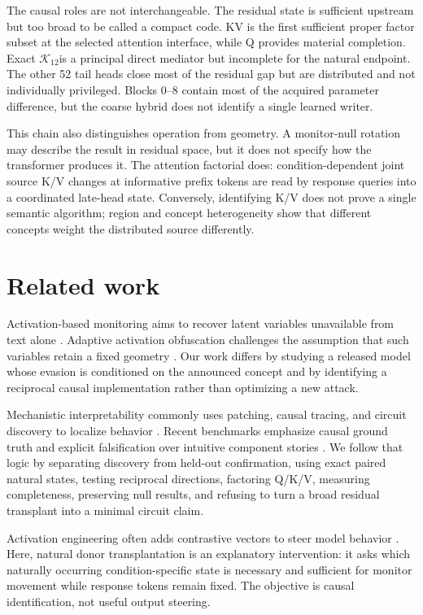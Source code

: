 \documentclass[10pt,twocolumn]{article}
\newcommand{\K}{\ensuremath{\mathcal{K}_{12}}}
\begin{document}
The causal roles are not interchangeable. The residual state is sufficient upstream but too broad to be called a compact code. KV is the first sufficient proper factor subset at the selected attention interface, while Q provides material completion. Exact \K is a principal direct mediator but incomplete for the natural endpoint. The other 52 tail heads close most of the residual gap but are distributed and not individually privileged. Blocks 0--8 contain most of the acquired parameter difference, but the coarse hybrid does not identify a single learned writer.

This chain also distinguishes operation from geometry. A monitor-null rotation may describe the result in residual space, but it does not specify how the transformer produces it. The attention factorial does: condition-dependent joint source K/V changes at informative prefix tokens are read by response queries into a coordinated late-head state. Conversely, identifying K/V does not prove a single semantic algorithm; region and concept heterogeneity show that different concepts weight the distributed source differently.

\section{Related work}

Activation-based monitoring aims to recover latent variables unavailable from text alone \citep{burns2023latent,zou2023representation}. Adaptive activation obfuscation challenges the assumption that such variables retain a fixed geometry \citep{bailey2024obfuscated,gupta2025rl,westphal2026still}. Our work differs by studying a released model whose evasion is conditioned on the announced concept and by identifying a reciprocal causal implementation rather than optimizing a new attack.

Mechanistic interpretability commonly uses patching, causal tracing, and circuit discovery to localize behavior \citep{meng2022locating,wang2023interpretability,conmy2023automated,kramar2024atp}. Recent benchmarks emphasize causal ground truth and explicit falsification over intuitive component stories \citep{mueller2025mib}. We follow that logic by separating discovery from held-out confirmation, using exact paired natural states, testing reciprocal directions, factoring Q/K/V, measuring completeness, preserving null results, and refusing to turn a broad residual transplant into a minimal circuit claim.

Activation engineering often adds contrastive vectors to steer model behavior \citep{turner2023steering,zou2023representation}. Here, natural donor transplantation is an explanatory intervention: it asks which naturally occurring condition-specific state is necessary and sufficient for monitor movement while response tokens remain fixed. The objective is causal identification, not useful output steering.
\end{document}
